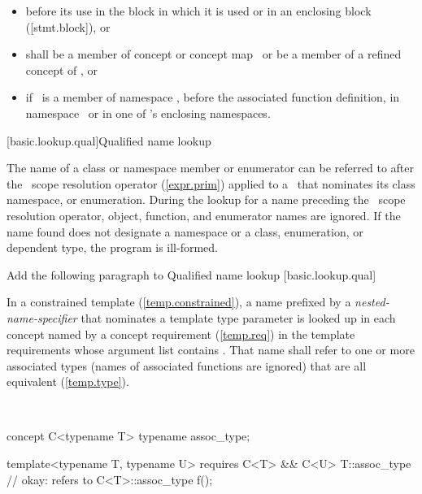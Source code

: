 \documentclass[american]{book}
\newcommand{\editorial}[1]{\colorbox{editbackground}{\begin{minipage}{\linewidth
}#1\end{minipage}}}
\begin{document}
\begin{paras}
\begin{itemize}
\item %
before its use in the block in which it is used or in an
enclosing block ([stmt.block]), or
\item %
shall be a member of concept or concept map
\ 
or be a member of a refined concept of
\tcode{X}, or
\item %
if
\ 
is a member of namespace
,
before the associated function definition,
in namespace
\ 
or in one of
\tcode{N} 's
enclosing namespaces.
\end{itemize}
\color{black}

\setcounter{subsection}{2}
[basic.lookup.qual]{Qualified name lookup}

\pnum
{}%
%
The name of a class or
namespace member 
or enumerator can be referred to after the
\tcode{::}\ 
scope resolution operator (\ref{expr.prim}) applied to a
\ 
that nominates its class namespace, or
enumeration.
During the lookup for a name preceding the
\tcode{::}\ 
scope resolution operator,
object, function, and enumerator names are ignored.
If the name found does not designate a namespace
or a class, enumeration, or dependent type, the program is ill-formed.


\editorial{Add the following paragraph to Qualified name lookup [basic.lookup.qual]}

\setcounter{Paras}{5}
\color{addclr}
\pnum
In a constrained template (\ref{temp.constrained}), a name prefixed by
a \emph{nested-name-specifier} that nominates a template type
parameter  is looked up in each concept named by a
concept requirement (\ref{temp.req}) in the template requirements
whose  \textcolor{addclr}{}argument list contains . That name
shall refer to one or more associated types (names of associated
functions are ignored) that are all equivalent (\ref{temp.type}). 

\enterexample\
\begin{codeblock}
concept C<typename T> {
  typename assoc_type;
}

template<typename T, typename U> requires C<T> && C<U>
  T::assoc_type     // okay: refers to C<T>::assoc_type
  f();
\end{codeblock}
\textcolor{addclr}{\exitexample}


\end{paras}
\end{document}
